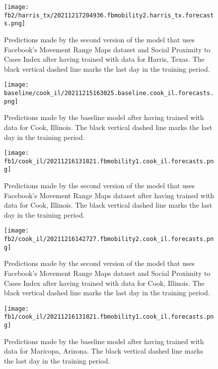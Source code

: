 \begin{figure}[!htb]
    \centering
    \texttt{[image: fb2/harris\_tx/20211217204936.fbmobility2.harris\_tx.forecasts.png]}
    \caption{Predictions made by the second version of the model that uses Facebook's Movement Range Maps dataset and Social Proximity to Cases Index after having trained with data for Harris, Texas. The black vertical dashed line marks the last day in the training period.}
    \label{fig:predictions-harris-fb2}
\end{figure}


\begin{figure}[!htb]
    \centering
    \texttt{[image: baseline/cook\_il/20211215163025.baseline.cook\_il.forecasts.png]}
    \caption{Predictions made by the baseline model after having trained with data for Cook, Illinois. The black vertical dashed line marks the last day in the training period.}
    \label{fig:predictions-cook-baseline}
\end{figure}

\begin{figure}[!htb]
    \centering
    \texttt{[image: fb1/cook\_il/20211216131821.fbmobility1.cook\_il.forecasts.png]}
    \caption{Predictions made by the second version of the model that uses Facebook's Movement Range Maps dataset after having trained with data for Cook, Illinois. The black vertical dashed line marks the last day in the training period.}
    \label{fig:predictions-cook-fb1}
\end{figure}

\begin{figure}[!htb]
    \centering
    \texttt{[image: fb2/cook\_il/20211216142727.fbmobility2.cook\_il.forecasts.png]}
    \caption{Predictions made by the second version of the model that uses Facebook's Movement Range Maps dataset and Social Proximity to Cases Index after having trained with data for Cook, Illinois. The black vertical dashed line marks the last day in the training period.}
    \label{fig:predictions-cook-fb2}
\end{figure}


\begin{figure}[!htb]
    \centering
    \texttt{[image: fb1/cook\_il/20211216131821.fbmobility1.cook\_il.forecasts.png]}
    \caption{Predictions made by the baseline model after having trained with data for Maricopa, Arizona. The black vertical dashed line marks the last day in the training period.}
    \label{fig:predictions-maricopa-baseline}
\end{figure}

